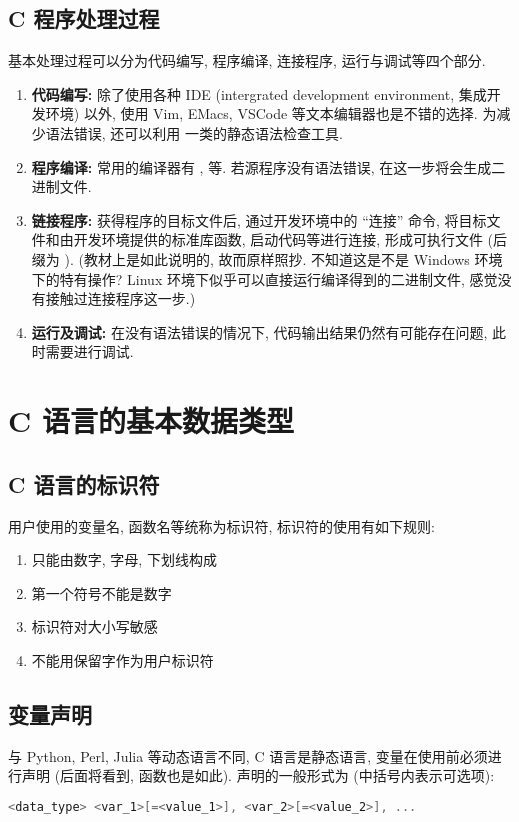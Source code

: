     \subsection{C 程序处理过程}
        \hspace*{2em} 基本处理过程可以分为代码编写, 程序编译, 连接程序, 运行与调试等四个部分.
            \begin{enumerate}
                \item \textbf{代码编写:} 除了使用各种 IDE (intergrated development environment, 集成开发环境) 以外, 使用 Vim, EMacs, VSCode 等文本编辑器也是不错的选择. 为减少语法错误, 还可以利用  一类的静态语法检查工具.
                \item \textbf{程序编译:} 常用的编译器有 ,  等. 若源程序没有语法错误, 在这一步将会生成二进制文件.
                \item \textbf{链接程序:} 获得程序的目标文件后, 通过开发环境中的 ``连接'' 命令, 将目标文件和由开发环境提供的标准库函数, 启动代码等进行连接, 形成可执行文件 (后缀为 ). (教材上是如此说明的, 故而原样照抄. 不知道这是不是 Windows 环境下的特有操作? Linux 环境下似乎可以直接运行编译得到的二进制文件, 感觉没有接触过连接程序这一步.)
                \item \textbf{运行及调试:} 在没有语法错误的情况下, 代码输出结果仍然有可能存在问题, 此时需要进行调试.
            \end{enumerate}

\section{C 语言的基本数据类型}
    \subsection{C 语言的标识符}
        \hspace*{2em} 用户使用的变量名, 函数名等统称为标识符, 标识符的使用有如下规则:
            \begin{enumerate}
                \item 只能由数字, 字母, 下划线构成
                \item 第一个符号不能是数字
                \item 标识符对大小写敏感
                \item 不能用保留字作为用户标识符
            \end{enumerate}

    \subsection{变量声明}
        \hspace*{2em} 与 Python, Perl, Julia 等动态语言不同, C 语言是静态语言, 变量在使用前必须进行声明 (后面将看到, 函数也是如此). 声明的一般形式为 (中括号内表示可选项):
            \begin{lstlisting}[language = {C}, gobble = 16]
                <data_type> <var_1>[=<value_1>], <var_2>[=<value_2>], ...
            \end{lstlisting}

